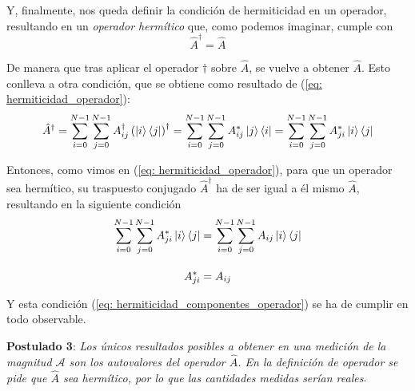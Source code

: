 \documentclass{article}
\numberwithin{equation}{section} %
\begin{document}
    \vspace{1.5mm}

    Y, finalmente, nos queda definir la condición de hermiticidad en un operador, resultando en un \textit{operador hermítico} que, como podemos imaginar, cumple con
    \begin{equation}
        \hat{A} ^ {\dagger} = \hat{A}
        \label{eq: hermiticidad_operador}
    \end{equation}

    \vspace{1.5mm}

    De manera que tras aplicar el operador \( \dagger \) sobre \( \hat{A} \), se vuelve a obtener \( \hat{A} \). Esto conlleva a otra condición, que se obtiene como resultado de (\ref{eq: hermiticidad_operador}):
    \begin{equation*}
        \hat{A} ^ {\dagger} = \sum_{i = 0}^{N - 1} \sum_{j = 0}^{N - 1} A_{ij}^{\dagger} \left( \ket{i} \bra{j} \right) ^ {\dagger} = \sum_{i = 0}^{N - 1} \sum_{j = 0}^{N - 1} A_{ij}^{*} \ket{j} \bra{i} = \sum_{i = 0}^{N - 1} \sum_{j = 0}^{N - 1} A_{ji}^{*} \ket{i} \bra{j}
    \end{equation*}

    \vspace{1.5mm}

    Entonces, como vimos en (\ref{eq: hermiticidad_operador}), para que un operador sea hermítico, su traspuesto conjugado \( \hat{A}^{\dagger} \) ha de ser igual a él mismo \( \hat{A} \), resultando en la siguiente condición
    \begin{align}
        \sum_{i = 0}^{N - 1} \sum_{j = 0}^{N - 1} A_{ji}^{*} \ket{i} \bra{j} &= \sum_{i = 0}^{N - 1} \sum_{j = 0}^{N - 1} A_{ij} \ket{i} \bra{j} \\[10pt]
        A_{ji}^{*} &= A_{ij} \label{eq: hermiticidad_componentes_operador}
    \end{align}

    \vspace{1.5mm}

    Y esta condición (\ref{eq: hermiticidad_componentes_operador}) se ha de cumplir en todo observable.
    
    \vspace{10mm}

    \textbf{Postulado 3}: \textit{Los únicos resultados posibles a obtener en una medición de la
    magnitud \( \mathcal{A}\) son los autovalores del operador \( \hat{A} \). En la definición de operador se
    pide que \( \hat{A} \) sea hermítico, por lo que las cantidades medidas serían reales}.
    
\end{document}

